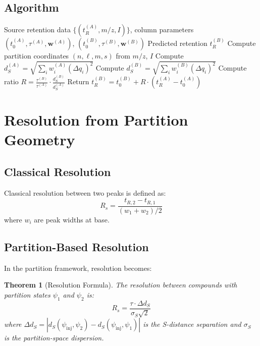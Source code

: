 \documentclass[twocolumn,10pt]{article}
\newtheorem{theorem}{Theorem}[section]
\begin{document}
\subsection{Algorithm}

\begin{algorithm}[H]
\caption{Virtual Column Switching}
\begin{algorithmic}[1]
\REQUIRE Source retention data $\{(t_R^{(A)}, m/z, I)\}$, column parameters $(t_0^{(A)}, \tau^{(A)}, \mathbf{w}^{(A)})$, $(t_0^{(B)}, \tau^{(B)}, \mathbf{w}^{(B)})$
\ENSURE Predicted retention $t_R^{(B)}$
\STATE Compute partition coordinates $(n, \ell, m, s)$ from $m/z$, $I$
\STATE Compute $d_S^{(A)} = \sqrt{\sum_i w_i^{(A)} (\Delta q_i)^2}$
\STATE Compute $d_S^{(B)} = \sqrt{\sum_i w_i^{(B)} (\Delta q_i)^2}$
\STATE Compute ratio $R = \frac{\tau^{(B)}}{\tau^{(A)}} \cdot \frac{d_S^{(B)}}{d_S^{(A)}}$
\STATE Return $t_R^{(B)} = t_0^{(B)} + R \cdot (t_R^{(A)} - t_0^{(A)})$
\end{algorithmic}
\end{algorithm}

\section{Resolution from Partition Geometry}
\label{sec:resolution}

\subsection{Classical Resolution}

Classical resolution between two peaks is defined as:
\begin{equation}
R_s = \frac{t_{R,2} - t_{R,1}}{(w_1 + w_2)/2}
\end{equation}
where $w_i$ are peak widths at base.

\subsection{Partition-Based Resolution}

In the partition framework, resolution becomes:

\begin{theorem}[Resolution Formula]
\label{thm:resolution}
The resolution between compounds with partition states $\psi_1$ and $\psi_2$ is:
\begin{equation}
R_s = \frac{\tau \cdot \Delta d_S}{\sigma_S \sqrt{2}}
\end{equation}
where $\Delta d_S = |d_S(\psi_{\text{inj}}, \psi_2) - d_S(\psi_{\text{inj}}, \psi_1)|$ is the S-distance separation and $\sigma_S$ is the partition-space dispersion.
\end{theorem}
\end{document}
